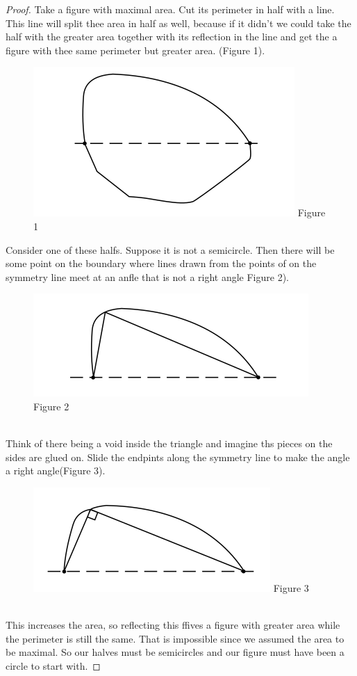 \documentclass[12pt, a4paper, titlepage]{article}
\begin{document}
\begin{proof}
Take a figure with maximal area. Cut its perimeter in half with a line. This line will split thee area in half as well, because if it didn't we could take the half with the greater area together with its reflection in the line and get the a figure with thee same perimeter but greater area. (Figure 1).\\
\begin{figure}[h]
\includegraphics[scale=0.5]{images/Figure1}
\centering
Figure 1
\centering
\end{figure}

Consider one of these halfs. Suppose it is not a semicircle. Then there will be some point on the boundary where lines drawn from the points of on the symmetry line meet at an anfle that is not a right angle Figure 2).\\
\begin{figure}[h]
\includegraphics[scale=0.5]{images/Figure2}
\centering
Figure 2
\centering
\end{figure}
\\
Think of there being a void inside the triangle and imagine ths pieces on the sides are glued on. Slide the endpints along the symmetry line to make the angle a right angle(Figure 3).\\
\begin{figure}[h]
\includegraphics[scale=0.5]{images/Figure3}
\centering
Figure 3
\centering
\end{figure}
\\
This increases the area, so reflecting this ffives a figure with greater area while the perimeter is still the same. That is impossible since we assumed the area to be maximal. So our halves must be semicircles and our figure must have been a circle to start with.
\end{proof}
\end{document}
